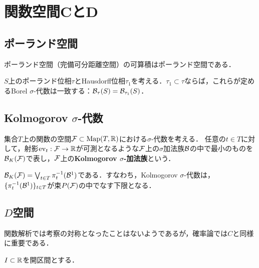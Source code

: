 \documentclass[uplatex,dvipdfmx]{jsreport}
\begin{document}
\section{関数空間CとD}

\subsection{ポーランド空間}

\begin{lemma}
    ポーランド空間（完備可分距離空間）の可算積はポーランド空間である．
\end{lemma}

\begin{theorem}
    $S$上のポーランド位相$\tau$とHausdorff位相$\tau_1$を考える．$\tau_1\subset\tau$ならば，これらが定めるBorel $\sigma$-代数は一致する：$\mathcal{B}_\tau(S)=\mathcal{B}_{\tau_1}(S)$．
\end{theorem}

\subsection{Kolmogorov $\sigma$-代数}

\begin{definition}
    集合$T$上の関数の空間$\mathcal{F}\subset\mathrm{Map}(T,\mathbb{R})$における$\sigma$-代数を考える．
    任意の$t\in T$に対して，射影$\mathrm{ev}_t:\mathcal{F}\to\mathbb{R}$が可測となるような$\mathcal{F}$上の$\sigma$加法族$\mathcal{B}$の中で最小のものを$\mathcal{B}_K(\mathcal{F})$で表し，$\mathcal{F}$上の\textbf{Kolmogorov $\sigma$-加法族}という．
\end{definition}

\begin{lemma}
    $\mathcal{B}_K(\mathcal{F})=\bigvee_{t\in T}\pi^{-1}_t(\mathcal{B}^1)$である．すなわち，Kolmogorov $\sigma$-代数は，$\{\pi^{-1}_t(\mathcal{B}^1)\}_{t\in T}$が束$P(\mathcal{F})$の中でなす下限となる．
\end{lemma}

\subsection{$D$空間}

\begin{tcolorbox}[colframe=ForestGreen, colback=ForestGreen!10!white,breakable,colbacktitle=ForestGreen!40!white,coltitle=black,fonttitle=\bfseries\sffamily,
title=]
    関数解析では考察の対称となったことはないようであるが，確率論では$C$と同様に重要である．
\end{tcolorbox}

\begin{notation}
    $I\subset\mathbb{R}$を開区間とする．
\end{notation}
\end{document}
